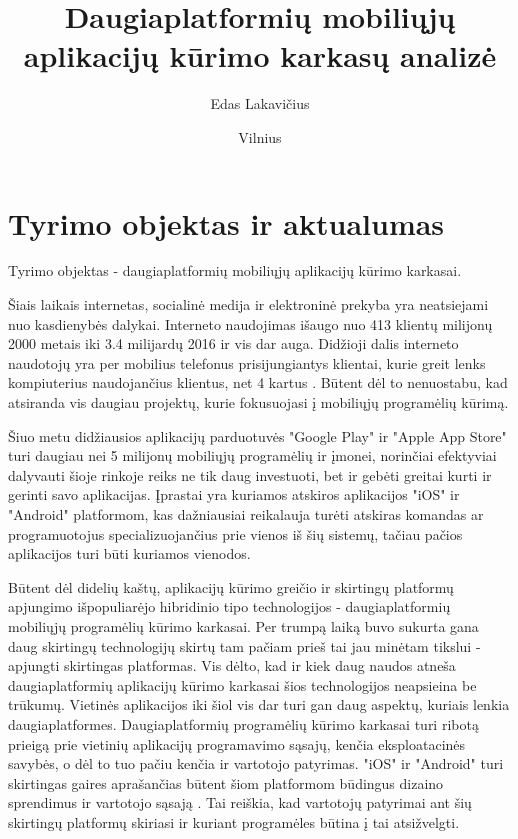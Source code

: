 \documentclass{VUMIFInfBakalaurinis}
\title{Daugiaplatformių mobiliųjų aplikacijų kūrimo karkasų analizė}
\author{Edas Lakavičius}
\date{Vilnius \\ \the\year}
\begin{document}
\maketitle

\tableofcontents

\section{Tyrimo objektas ir aktualumas}
Tyrimo objektas - daugiaplatformių mobiliųjų aplikacijų kūrimo karkasai.

Šiais laikais internetas, socialinė medija ir elektroninė prekyba yra neatsiejami nuo kasdienybės dalykai. Interneto naudojimas išaugo nuo 413 klientų milijonų 2000 metais iki 3.4 milijardų 2016 \cite{owidinternet} ir vis dar auga. Didžioji dalis interneto naudotojų yra per mobilius telefonus prisijungiantys klientai, kurie greit lenks kompiuterius naudojančius klientus, net 4 kartus \cite{internetusage}. Būtent dėl to nenuostabu, kad atsiranda vis daugiau projektų, kurie fokusuojasi į mobiliųjų programėlių kūrimą.

Šiuo metu didžiausios aplikacijų parduotuvės "Google Play" ir "Apple App Store" turi daugiau nei 5 milijonų mobiliųjų programėlių \cite{appcount} ir įmonei, norinčiai efektyviai dalyvauti šioje rinkoje reiks ne tik daug investuoti, bet ir gebėti greitai kurti ir gerinti savo aplikacijas. Įprastai yra kuriamos atskiros aplikacijos "iOS" ir "Android" platformom, kas dažniausiai reikalauja turėti atskiras komandas ar programuotojus specializuojančius prie vienos iš šių sistemų, tačiau pačios aplikacijos turi būti kuriamos vienodos.

Būtent dėl didelių kaštų, aplikacijų kūrimo greičio ir skirtingų platformų apjungimo išpopuliarėjo hibridinio tipo technologijos - daugiaplatformių mobiliųjų programėlių kūrimo karkasai. Per trumpą laiką buvo sukurta gana daug skirtingų technologijų skirtų tam pačiam prieš tai jau minėtam tikslui - apjungti skirtingas platformas. Vis dėlto, kad ir kiek daug naudos atneša daugiaplatformių aplikacijų kūrimo karkasai šios technologijos neapsieina be trūkumų. Vietinės aplikacijos iki šiol vis dar turi gan daug aspektų, kuriais lenkia daugiaplatformes. Daugiaplatformių programėlių kūrimo karkasai turi ribotą prieigą prie vietinių aplikacijų programavimo sąsajų, kenčia eksploatacinės savybės, o dėl to tuo pačiu kenčia ir vartotojo patyrimas. "iOS" ir "Android" turi skirtingas gaires aprašančias būtent šiom platformom būdingus dizaino sprendimus ir vartotojo sąsają \cite{androidui iosui}. Tai reiškia, kad vartotojų patyrimai ant šių skirtingų platformų skiriasi ir kuriant programėles būtina į tai atsižvelgti.
\end{document}
